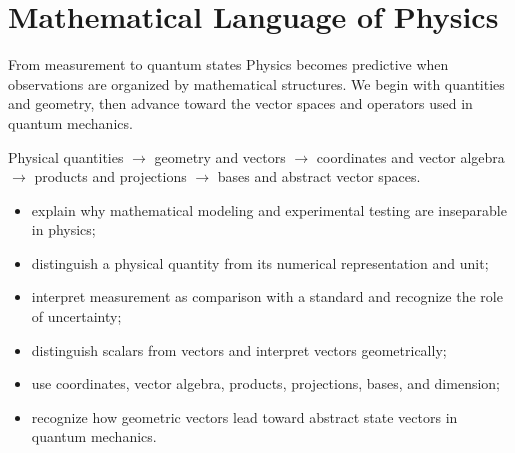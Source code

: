 \chapter{Mathematical Language of Physics}
\label{ch:mathematical-language-of-physics}

\chapteropeningart
{From measurement to quantum states}
{Physics becomes predictive when observations are organized by mathematical structures. We begin with quantities and geometry, then advance toward the vector spaces and operators used in quantum mechanics.}


\begin{roadmapbox}
Physical quantities $\longrightarrow$ geometry and vectors $\longrightarrow$
coordinates and vector algebra $\longrightarrow$ products and projections
$\longrightarrow$ bases and abstract vector spaces.
\end{roadmapbox}

\learningobjectives
\begin{itemize}
\item explain why mathematical modeling and experimental testing are inseparable in physics;
\item distinguish a physical quantity from its numerical representation and unit;
\item interpret measurement as comparison with a standard and recognize the role of uncertainty;
\item distinguish scalars from vectors and interpret vectors geometrically;
\item use coordinates, vector algebra, products, projections, bases, and dimension;
\item recognize how geometric vectors lead toward abstract state vectors in quantum mechanics.
\end{itemize}

